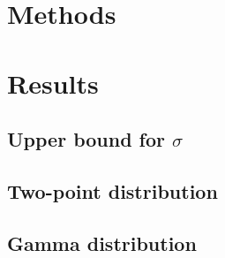 \documentclass{scrreprt}
\begin{document}
\section{Methods}


  
  
\section{Results}

  \subsection*{Upper bound for $\sigma$}

    

  \subsection*{Two-point distribution}  

    

  \subsection*{Gamma distribution}

    
\end{document}
